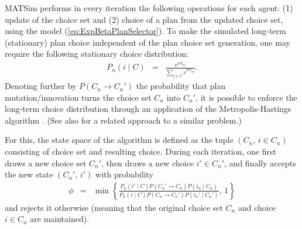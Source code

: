 MATSim performs in every iteration the following operations for each
agent: (1) update of the choice set and (2) choice of a plan from
the updated choice set, using the model (\ref{eq:ExpBetaPlanSelector}).
To make the simulated long-term (stationary) plan choice independent
of the plan choice set generation, one may require the following stationary
choice distribution:
\begin{eqnarray}
P_{n}(i\mid C) & = & \frac{e^{\mu S_{ni}}}{\sum_{j\in C}e^{\mu S_{nj}}}.\label{eq:global-choice-model}
\end{eqnarray}
Denoting further by $P(C_{n}\rightarrow C_{n}')$ the probability
that plan mutation/innovation turns the choice set $C_{n}$ into $C_{n}'$,
it is possible to enforce the long-term choice distribution 
through an application of the Metropolis-Hastings algorithm \citep{hastings-1970}.
(See also \citet{floetteroed-2012b} for a related approach to a similar
problem.)

For this, the state space of the algorithm is defined as the tuple
$(C_{n},\, i\in C_{n})$ consisting of choice set and resulting choice.
During each iteration, one first draws a new choice set $C_{n}'$,
then draws a new choice $i'\in C_{n}'$, and finally accepts the new
state $(C_{n}',\, i')$ with probability
\begin{eqnarray}
\phi & = & \min\left\{ \frac{{\displaystyle P_{n}(i'\mid C)P(C_{n}'\rightarrow C_{n})P(i_{n}\mid C_{n})}}{{\displaystyle P_{n}(i\mid C)P(C_{n}\rightarrow C_{n}')P(i_{n}'\mid C_{n}')}},\,1\right\} \label{eq:accept-proba-1}
\end{eqnarray}
and rejects it otherwise (meaning that the original choice set $C_{n}$
and choice $i\in C_{n}$ are maintained).



